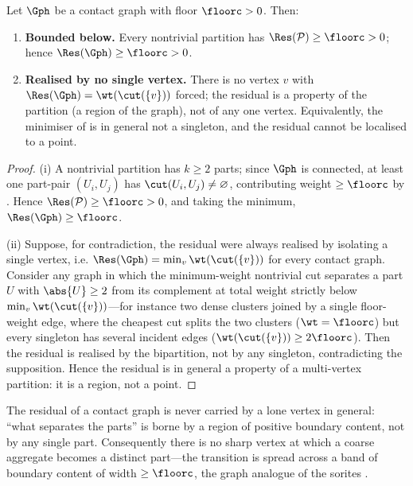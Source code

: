 \begin{theorem}
\label{thm:residual-region}
Let $\Gph$ be a contact graph with floor $\floorc>0$. Then:
\begin{enumerate}[label=\textup{(\roman*)},leftmargin=2.2em]
\item \textbf{Bounded below.} Every nontrivial partition has
$\Res(\mathcal{P})\ge\floorc>0$; hence $\Res(\Gph)\ge\floorc>0$.
\item \textbf{Realised by no single vertex.} There is no vertex $v$ with
$\Res(\Gph)=\wt(\cut(\{v\}))$ forced; the residual is a property of the
partition (a region of the graph), not of any one vertex. Equivalently, the
minimiser of  is in general not a singleton, and the residual
cannot be localised to a point.
\end{enumerate}
\end{theorem}

\begin{proof}
(i) A nontrivial partition has $k\ge2$ parts; since $\Gph$ is connected, at
least one part-pair $(U_i,U_j)$ has $\cut(U_i,U_j)\neq\varnothing$, contributing
weight $\ge\floorc$ by . Hence $\Res(\mathcal{P})\ge\floorc>0$,
and taking the minimum, $\Res(\Gph)\ge\floorc$.

(ii) Suppose, for contradiction, the residual were always realised by isolating a
single vertex, i.e. $\Res(\Gph)=\min_v\wt(\cut(\{v\}))$ for every contact graph.
Consider any graph in which the minimum-weight nontrivial cut separates a part
$U$ with $\abs{U}\ge 2$ from its complement at total weight strictly below
$\min_v\wt(\cut(\{v\}))$---for instance two dense clusters joined by a single
floor-weight edge, where the cheapest cut splits the two clusters
($\wt=\floorc$) but every singleton has several incident edges
($\wt(\cut(\{v\}))\ge 2\floorc$). Then the residual is realised by the
bipartition, not by any singleton, contradicting the supposition. Hence the
residual is in general a property of a multi-vertex partition: it is a region,
not a point.
\end{proof}

\begin{corollary}
\label{cor:point-forbidden}
The residual of a contact graph is never carried by a lone vertex in general:
``what separates the parts'' is borne by a region of positive boundary content,
not by any single part. Consequently there is no sharp vertex at which a coarse
aggregate becomes a distinct part---the transition is spread across a band of
boundary content of width $\ge\floorc$, the graph analogue of the sorites
\citep{black1937,williamson1994}.
\end{corollary}

